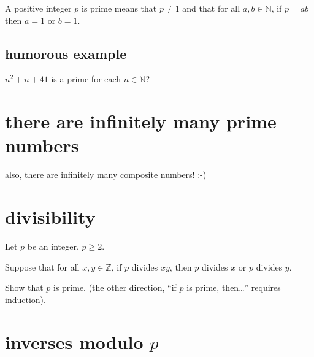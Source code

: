 \documentclass[12pt]{handout}
\begin{document}
A positive integer $p$ is prime means that $p \neq 1$ and that for all $a, b \in \mathbb{N}$, if $p = ab$ then $a=1$ or $b = 1$.

\subsection*{humorous example}

$n^2 + n + 41$ is a prime for each $n \in \mathbb{N}$?

\section*{there are infinitely many prime numbers}

also, there are infinitely many composite numbers!  :-)

\section*{divisibility}

Let $p$ be an integer, $p \geq 2$.

Suppose that for all $x,y \in \mathbb{Z}$, if $p$ divides $xy$, then $p$ divides $x$ or $p$ divides $y$.

Show that $p$ is prime.  (the other direction, ``if $p$ is prime, then\ldots'' requires induction).

\section*{inverses modulo $p$}
\end{document}
